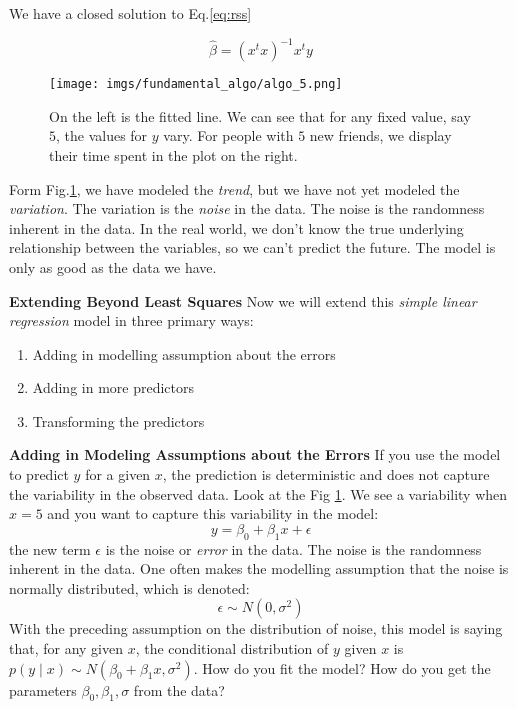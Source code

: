 We have a closed solution to Eq.\ref{eq:rss}

$$
    \hat{\beta}=\left(x^{t} x\right)^{-1} x^{t} y
$$

\begin{figure}[H]
    \centering
    \texttt{[image: imgs/fundamental\_algo/algo\_5.png]}
    \caption{On the left is the fitted line. We can see that for any fixed value, say $5$, the values for $y$ vary. For people with $5$ new friends, we display their time spent in the plot on the right.}
    \label{fig:algo_5}
\end{figure}

Form Fig.\ref{fig:algo_5}, we have modeled the \textit{trend}, but we have not yet modeled the \textit{variation}. The variation is the \textit{noise} in the data. The noise is the randomness inherent in the data. In the real world, we don't know the true underlying relationship between the variables, so we can't predict the future. The model is only as good as the data we have.

\textbf{Extending Beyond Least Squares} Now we will extend this \textit{simple linear regression} model in three primary ways:

\begin{enumerate}
    \item Adding in modelling assumption about the errors
    \item Adding in more predictors
    \item Transforming the predictors
\end{enumerate}

\textbf{Adding in Modeling Assumptions about the Errors} If you use the model to predict \(y\) for a given \(x\), the prediction is deterministic and does not capture the variability in the observed data. Look at the Fig \ref{fig:algo_5}. We see a variability when \(x=5\) and you want to capture this variability in the model:
\begin{equation}
    y=\beta_{0}+\beta_{1} x+\epsilon
\end{equation}
the new term \(\epsilon\) is the noise or \textit{error} in the data. The noise is the randomness inherent in the data. One often makes the modelling assumption that the noise is normally distributed, which is denoted:
\begin{equation}
    \epsilon \sim N\left(0, \sigma^{2}\right)
\end{equation}
With the preceding assumption on the distribution of noise, this model is saying that, for any given \(x\), the conditional distribution of \(y\) given \(x\) is \(p(y \mid x) \sim N\left(\beta_{0}+\beta_{1} x, \sigma^{2}\right)\). How do you fit the model? How do you get the parameters \(\beta_{0}, \beta_{1}, \sigma\) from the data?

